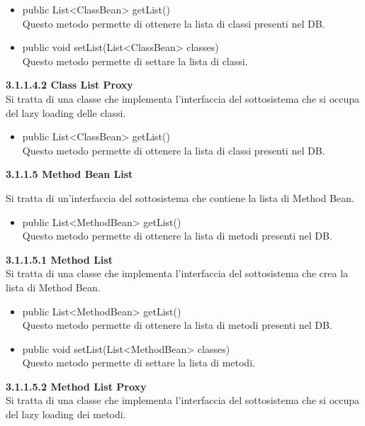 \documentclass[11pt]{article}
\begin{document}
\begin{description}
				\begin{itemize}
					\item public List<ClassBean> getList() \\
					Questo metodo permette di ottenere la lista di classi presenti nel DB.
					\item public void setList(List<ClassBean> classes)\\
					Questo metodo permette di settare la lista di classi.
				\end{itemize}
			
				\item \textbf{ 3.1.1.4.2  Class List Proxy} \\
				Si tratta di una classe che implementa l'interfaccia del sottosistema che si occupa del lazy loading delle classi.
				
				\begin{itemize}
					\item public List<ClassBean> getList() \\
					Questo metodo permette di ottenere la lista di classi presenti nel DB.
				\end{itemize}
				
				\item \textbf{3.1.1.5  Method Bean List} 
			
			\item Si tratta di un'interfaccia del sottosistema che contiene la lista di Method Bean. 
			
			\begin{itemize}
				\item public List<MethodBean> getList() \\
				Questo metodo permette di ottenere la lista di metodi presenti nel DB.
			\end{itemize}
				\item \textbf{ 3.1.1.5.1  Method List} \\
				Si tratta di una classe che implementa l'interfaccia del sottosistema che crea la lista di Method Bean.
				
				\begin{itemize}
					\item public List<MethodBean> getList() \\
					Questo metodo permette di ottenere la lista di metodi presenti nel DB.
					\item public void setList(List<MethodBean> classes)\\
					Questo metodo permette di settare la lista di metodi.
				\end{itemize}
			\item \textbf{ 3.1.1.5.2  Method List Proxy} \\
			Si tratta di una classe che implementa l'interfaccia del sottosistema che si occupa del lazy loading dei metodi.
			

\end{description}
\end{document}
